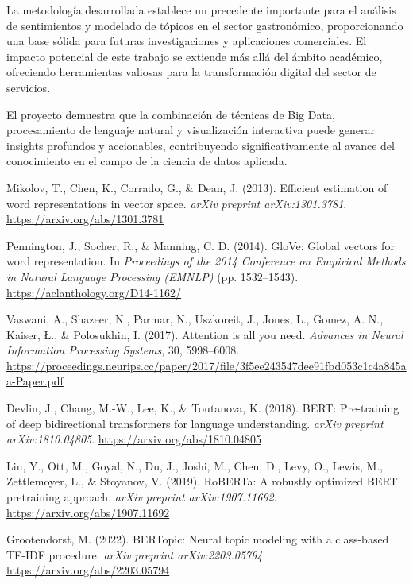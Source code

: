\documentclass[12pt,a4paper,twoside,openany]{book}
\begin{document}
La metodología desarrollada establece un precedente importante para el análisis de sentimientos y modelado de tópicos en el sector gastronómico, proporcionando una base sólida para futuras investigaciones y aplicaciones comerciales. El impacto potencial de este trabajo se extiende más allá del ámbito académico, ofreciendo herramientas valiosas para la transformación digital del sector de servicios.

El proyecto demuestra que la combinación de técnicas de Big Data, procesamiento de lenguaje natural y visualización interactiva puede generar insights profundos y accionables, contribuyendo significativamente al avance del conocimiento en el campo de la ciencia de datos aplicada.

\begin{thebibliography}{99}

Mikolov, T., Chen, K., Corrado, G., \& Dean, J. (2013). Efficient estimation of word representations in vector space. \textit{arXiv preprint arXiv:1301.3781}. \url{https://arxiv.org/abs/1301.3781}

Pennington, J., Socher, R., \& Manning, C. D. (2014). GloVe: Global vectors for word representation. In \textit{Proceedings of the 2014 Conference on Empirical Methods in Natural Language Processing (EMNLP)} (pp. 1532–1543). \url{https://aclanthology.org/D14-1162/}

Vaswani, A., Shazeer, N., Parmar, N., Uszkoreit, J., Jones, L., Gomez, A. N., Kaiser, Ł., \& Polosukhin, I. (2017). Attention is all you need. \textit{Advances in Neural Information Processing Systems}, 30, 5998–6008. \url{https://proceedings.neurips.cc/paper/2017/file/3f5ee243547dee91fbd053c1c4a845aa-Paper.pdf}

Devlin, J., Chang, M.-W., Lee, K., \& Toutanova, K. (2018). BERT: Pre-training of deep bidirectional transformers for language understanding. \textit{arXiv preprint arXiv:1810.04805}. \url{https://arxiv.org/abs/1810.04805}

Liu, Y., Ott, M., Goyal, N., Du, J., Joshi, M., Chen, D., Levy, O., Lewis, M., Zettlemoyer, L., \& Stoyanov, V. (2019). RoBERTa: A robustly optimized BERT pretraining approach. \textit{arXiv preprint arXiv:1907.11692}. \url{https://arxiv.org/abs/1907.11692}

Grootendorst, M. (2022). BERTopic: Neural topic modeling with a class-based TF-IDF procedure. \textit{arXiv preprint arXiv:2203.05794}. \url{https://arxiv.org/abs/2203.05794}


\end{thebibliography}
\end{document}
